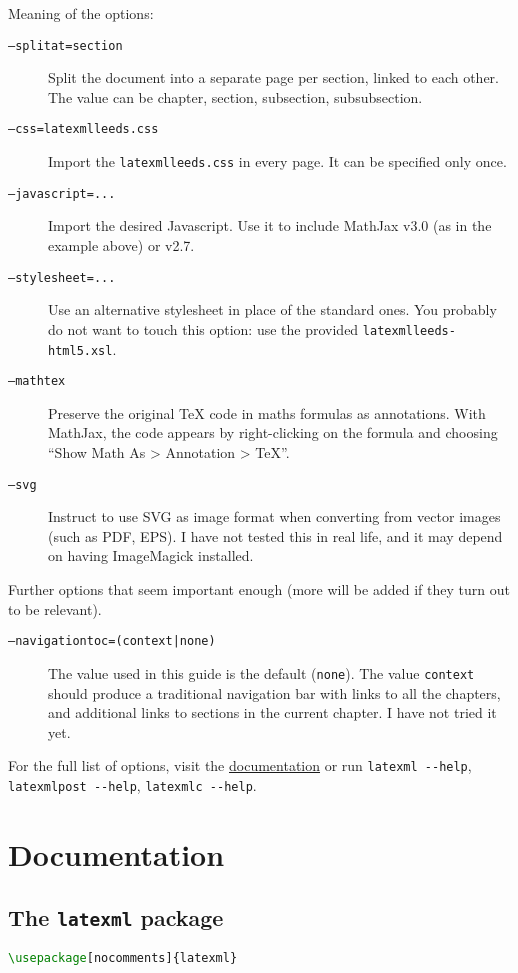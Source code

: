 \documentclass[a4paper]{article}
\theoremstyle{definition}
\begin{document}
Meaning of the options:
\begin{description}
  \item[\texttt{--splitat=section}] Split the document into a separate \HTML{} page per section, linked to each other. The value can be chapter, section, subsection, subsubsection.
  \item[\texttt{--css=latexmlleeds.css}] Import the \CSS{} \verb|latexmlleeds.css| in every page. It can be specified only once.
  \item[\texttt{--javascript=...}] Import the desired Javascript. Use it to include MathJax v3.0 (as in the example above) or v2.7.
  \item[\texttt{--stylesheet=...}] Use an alternative \XSLT{} stylesheet in place of the standard ones. You probably do not want to touch this option: use the provided \verb|latexmlleeds-html5.xsl|.
  \item[\texttt{--mathtex}] Preserve the original \TeX{} code in maths formulas as annotations. With MathJax, the code appears by right-clicking on the formula and choosing ``Show Math As > Annotation > TeX''.
  \item[\texttt{--svg}] Instruct \LaTeXML{} to use SVG as image format when converting from vector images (such as PDF, EPS). I have not tested this in real life, and it may depend on having ImageMagick installed.
\end{description}
Further options that seem important enough (more will be added if they turn out to be relevant).
\begin{description}
  \item[\texttt{--navigationtoc=(context|none)}] The value used in this guide is the default (\verb|none|). The value \verb|context| should produce a traditional navigation bar with links to all the chapters, and additional links to sections in the current chapter. I have not tried it yet.
\end{description}
For the full list of options, visit the \href{https://dlmf.nist.gov/LaTeXML/docs.html}{\LaTeXML{} documentation} or run \verb|latexml --help|, \verb|latexmlpost --help|, \verb|latexmlc --help|.


\section{Documentation}

\subsection{The \texttt{latexml} package}
\begin{lstlisting}[language=TeX,caption={Import \texttt{latexml} in the preamble}]
  \usepackage[nocomments]{latexml}
\end{lstlisting}
\end{document}
